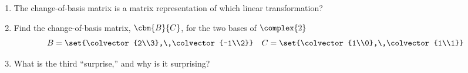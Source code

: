 \begin{enumerate}
%
\item The change-of-basis matrix is a matrix representation of which linear transformation?
%
\item Find the change-of-basis matrix, $\cbm{B}{C}$, for the two bases of $\complex{2}$
%
\begin{align*}
B&=\set{\colvector{2\\3},\,\colvector{-1\\2}}&
C&=\set{\colvector{1\\0},\,\colvector{1\\1}}
\end{align*}
%
\item What is the third ``surprise,'' and why is it surprising?
%
\end{enumerate}